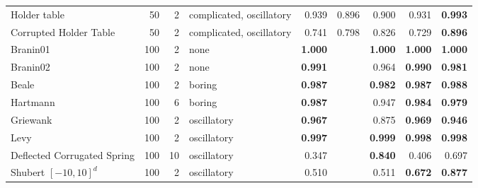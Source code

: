 \begin{table*}[t]
{\begin{tabular}{lrrlrr|rrr}
            Holder table                   & 50    & 2   & complicated, oscillatory       & 0.939                  & 0.896                         & 0.900                           & 0.931                             & \textbf{0.993}          \\
            Corrupted Holder Table         & 50    & 2   & complicated, oscillatory       & 0.741                  & 0.798                         & 0.826                           & 0.729                             & \textbf{0.896}          \\
            \midrule
            Branin01                       & 100   & 2   & none                           & \textbf{1.000}         &                               & \textbf{1.000}                  & \textbf{1.000}                    & \textbf{1.000}          \\
            Branin02                       & 100   & 2   & none                           & \textbf{0.991}         &                               & 0.964                           & \textbf{0.990}                    & \textbf{0.981}          \\
            Beale                          & 100   & 2   & boring                         & \textbf{0.987}         &                               & \textbf{0.982}                  & \textbf{0.987}                    & \textbf{0.988}          \\
            Hartmann                       & 100   & 6   & boring                         & \textbf{0.987}         &                               & 0.947                           & \textbf{0.984}                    & \textbf{0.979}          \\
            Griewank                       & 100   & 2   & oscillatory                    & \textbf{0.967}         &                               & 0.875                           & \textbf{0.969}                    & \textbf{0.946}          \\
            Levy                           & 100   & 2   & oscillatory                    & \textbf{0.997}         &                               & \textbf{0.999}                  & \textbf{0.998}                    & \textbf{0.998}          \\
            Deflected Corrugated Spring    & 100   & 10  & oscillatory                    & 0.347                  &                               & \textbf{0.840}                  & 0.406                             & 0.697                   \\
            Shubert $[-10, 10]^d$          & 100   & 2   & oscillatory                    & 0.510                  &                               & 0.511                           & \textbf{0.672}                    & \textbf{0.877}          \\

\end{tabular}}
\end{table*}
